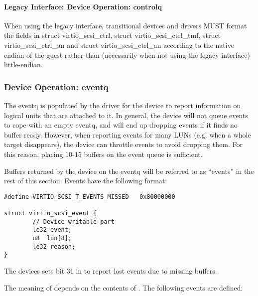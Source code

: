 \paragraph{Legacy Interface: Device Operation: controlq}\label{sec:Device Types / SCSI Host Device / Device Operation / Device Operation: controlq / Legacy Interface: Device Operation: controlq}

When using the legacy interface, transitional devices and drivers
MUST format the fields in struct virtio_scsi_ctrl, struct
virtio_scsi_ctrl_tmf, struct virtio_scsi_ctrl_an and struct
virtio_scsi_ctrl_an
according to the native endian of the guest rather than
(necessarily when not using the legacy interface) little-endian.


\subsubsection{Device Operation: eventq}\label{sec:Device Types / SCSI Host Device / Device Operation / Device Operation: eventq}

The eventq is populated by the driver for the device to report information on logical
units that are attached to it. In general, the device will not
queue events to cope with an empty eventq, and will end up
dropping events if it finds no buffer ready. However, when
reporting events for many LUNs (e.g. when a whole target
disappears), the device can throttle events to avoid dropping
them. For this reason, placing 10-15 buffers on the event queue
is sufficient.

Buffers returned by the device on the eventq will be referred to
as ``events'' in the rest of this section. Events have the
following format:

\begin{lstlisting}
#define VIRTIO_SCSI_T_EVENTS_MISSED   0x80000000

struct virtio_scsi_event {
        // Device-writable part
        le32 event;
        u8  lun[8];
        le32 reason;
}
\end{lstlisting}

The devices sets bit 31 in  to report lost events
due to missing buffers.

The meaning of  depends on the
contents of . The following events are defined:

